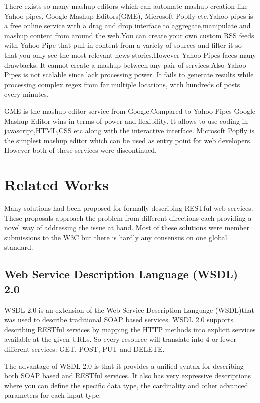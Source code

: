 \documentclass[journal]{IEEEtran}
\begin{document}
There exists so many mashup editors which can automate mashup creation like Yahoo pipes\cite{pip}, Google Mashup Editors(GME), Microsoft Popfly etc.Yahoo pipes is a free online service with a drag and drop interface to aggregate,manipulate and mashup content from around the web.You can create your own custom RSS feeds with Yahoo Pipe that pull in content from a variety of sources and filter it so that you only see the most relevant news stories.However Yahoo Pipes faces many drawbacks. It cannot create a mashup between any pair of services.Also Yahoo Pipes is not scalable since lack processing power. It fails to generate results while processing complex regex from far multiple locations, with hundreds of posts every minutes.

GME is the  mashup editor service from Google.Compared to Yahoo Pipes Google Mashup Editor wins in terms of power and flexibility. It allows to use coding in javascript,HTML,CSS etc along with the interactive interface. Microsoft Popfly is the simplest mashup editor which can be used as entry point for web developers. However both of these services were discontinued. 

\section{Related Works}
Many solutions had been proposed for formally describing RESTful web services. These proposals approach the problem  from different directions each providing a novel way of addressing the issue at hand. Most of these solutions were member submissions to the W3C but there is hardly any consensus on one global standard.

\subsection{Web Service Description Language (WSDL) 2.0}
WSDL 2.0\cite{chinnici2007web} is an extension of the Web Service Description Language (WSDL)that was used to describe traditional SOAP based services. WSDL 2.0 supports describing RESTful services by mapping the HTTP methods into explicit services available at the given URLs. So every resource will translate into 4 or fewer different services: GET, POST, PUT and DELETE. 
      
The advantage of WSDL 2.0 is that it provides a unified syntax for describing both SOAP based and RESTful services. It also has very expressive descriptions where you can define the specific data type, the cardinality and other advanced parameters for each input type. 
   
\end{document}
